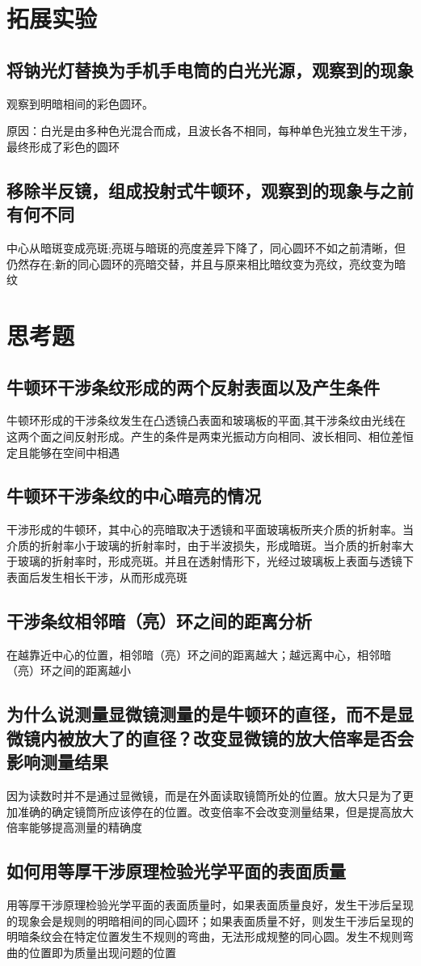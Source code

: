 \documentclass[UTF8]{ctexart}
\begin{document}
\section{拓展实验}
\subsection{将钠光灯替换为手机手电筒的白光光源，观察到的现象}
观察到明暗相间的彩色圆环。

原因：白光是由多种色光混合而成，且波长各不相同，每种单色光独立发生干涉，最终形成了彩色的圆环


\subsection{移除半反镜，组成投射式牛顿环，观察到的现象与之前有何不同}
中心从暗斑变成亮斑;亮斑与暗斑的亮度差异下降了，同心圆环不如之前清晰，但仍然存在;新的同心圆环的亮暗交替，并且与原来相比暗纹变为亮纹，亮纹变为暗纹


\vspace{7cm}

\section{思考题}
\subsection{牛顿环干涉条纹形成的两个反射表面以及产生条件}
牛顿环形成的干涉条纹发生在凸透镜凸表面和玻璃板的平面,其干涉条纹由光线在这两个面之间反射形成。产生的条件是两束光振动方向相同、波长相同、相位差恒定且能够在空间中相遇

\subsection{牛顿环干涉条纹的中心暗亮的情况}
干涉形成的牛顿环，其中心的亮暗取决于透镜和平面玻璃板所夹介质的折射率。当介质的折射率小于玻璃的折射率时，由于半波损失，形成暗斑。当介质的折射率大于玻璃的折射率时，形成亮斑。并且在透射情形下，光经过玻璃板上表面与透镜下表面后发生相长干涉，从而形成亮斑

\subsection{干涉条纹相邻暗（亮）环之间的距离分析}
在越靠近中心的位置，相邻暗（亮）环之间的距离越大；越远离中心，相邻暗（亮）环之间的距离越小

\subsection{为什么说测量显微镜测量的是牛顿环的直径，而不是显微镜内被放大了的直径？改变显微镜的放大倍率是否会影响测量结果}
因为读数时并不是通过显微镜，而是在外面读取镜筒所处的位置。放大只是为了更加准确的确定镜筒所应该停在的位置。改变倍率不会改变测量结果，但是提高放大倍率能够提高测量的精确度

\subsection{如何用等厚干涉原理检验光学平面的表面质量}
用等厚干涉原理检验光学平面的表面质量时，如果表面质量良好，发生干涉后呈现的现象会是规则的明暗相间的同心圆环；如果表面质量不好，则发生干涉后呈现的明暗条纹会在特定位置发生不规则的弯曲，无法形成规整的同心圆。发生不规则弯曲的位置即为质量出现问题的位置
\end{document}
